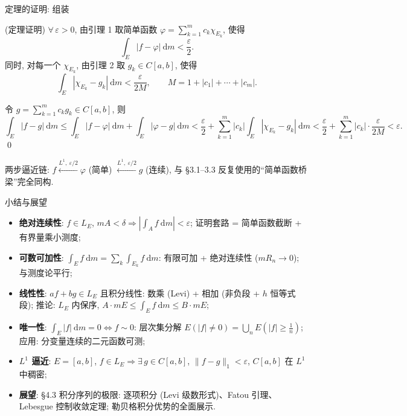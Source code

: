
\begin{frame}{定理的证明: 组装}

\startproof[bg=yellow, fg=red](定理证明)
$\forall\, \varepsilon > 0$, 由引理 1 取简单函数 $\varphi = \sum_{k=1}^{m} c_k \chi_{E_k}$, 使得
\[
\int_E |f - \varphi| ~ \mathrm{d} m < \frac{\varepsilon}{2} .
\]
同时, 对每一个 $\chi_{E_k}$, 由引理 2 取 $g_k \in C[a, b]$, 使得
\[
\int_E |\chi_{E_k} - g_k| ~ \mathrm{d} m < \frac{\varepsilon}{2M},
\qquad M = 1 + |c_1| + \cdots + |c_m| .
\]

\pause

令 $g = \sum_{k=1}^{m} c_k g_k \in C[a, b]$, 则
\[
\int_E |f - g| ~ \mathrm{d} m
\leqslant \int_E |f - \varphi| ~ \mathrm{d} m + \int_E |\varphi - g| ~ \mathrm{d} m
< \frac{\varepsilon}{2} + \sum_{k=1}^{m} |c_k| \int_E |\chi_{E_k} - g_k| ~ \mathrm{d} m
< \frac{\varepsilon}{2} + \sum_{k=1}^{m} |c_k| \cdot \frac{\varepsilon}{2M}
< \varepsilon .
\]
\qed

\pause

\begin{attnblock}
两步逼近链: $f \xleftarrow{L^1,\ \varepsilon/2} \varphi$ (简单)
$\xleftarrow{L^1,\ \varepsilon/2} g$ (连续),
与 \S 3.1--3.3 反复使用的``简单函数桥梁''完全同构.
\end{attnblock}

\end{frame}




\begin{frame}{小结与展望}

\begin{itemize}
\item \textbf{绝对连续性}: $f \in L_E$, $mA < \delta \Rightarrow |\int_A f ~ \mathrm{d} m| < \varepsilon$;
  证明套路 = 简单函数截断 + 有界量乘小测度;
\pause
\item \textbf{可数可加性}: $\int_E f ~ \mathrm{d} m = \sum_k \int_{E_k} f ~ \mathrm{d} m$:
  有限可加 + 绝对连续性 ($mR_n \to 0$); 与测度论平行;
\pause
\item \textbf{线性性}: $af + bg \in L_E$ 且积分线性: 数乘 (Levi) + 相加 (非负段 + $h$ 恒等式段);
  推论: $L_E$ 内保序, $A \cdot mE \leqslant \int_E f ~ \mathrm{d} m \leqslant B \cdot mE$;
\pause
\item \textbf{唯一性}: $\int_E |f| ~ \mathrm{d} m = 0 \iff f \sim 0$:
  层次集分解 $E(|f| \neq 0) = \bigcup_n E(|f| \geqslant \tfrac1n)$;
  应用: 分变量连续的二元函数可测;
\pause
\item \textbf{$L^1$ 逼近}: $E = [a,b]$, $f \in L_E \Rightarrow \exists\, g \in C[a,b]$,
  $\|f - g\|_1 < \varepsilon$, $C[a,b]$ 在 $L^1$ 中稠密;
\pause
\item \textbf{展望}: §4.3 积分序列的极限: 逐项积分 (Levi 级数形式)、Fatou 引理、
  Lebesgue 控制收敛定理; 勒贝格积分优势的全面展示.
\end{itemize}

\end{frame}





